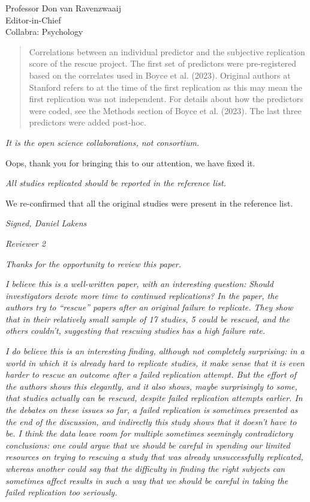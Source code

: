 \documentclass{stanfordletter}
\newcommand{\theysaid}[1]{\begin{leftbar} \noindent 
		\textsl{ #1}\end{leftbar}}
\newcommand{\revised}[1]{\begin{quote}	#1 \end{quote}}
\begin{document}
\begin{letter}{Professor Don van Ravenzwaaij \\ Editor-in-Chief \\ Collabra: Psychology }
		\revised{Correlations between an individual predictor and the subjective replication score of the rescue project. The first set of predictors were pre-registered based on the correlates used in Boyce et al. (2023). Original authors at Stanford refers to at the time of the first replication as this may mean the first replication was not independent. For details about how the predictors were coded, see the Methods section of Boyce et al. (2023). The last three predictors were added post-hoc.}
		

		\theysaid{It is the open science collaborations, not consortium.}
		
		Oops, thank you for bringing this to our attention, we have fixed it. 
		
		\theysaid{All studies replicated should be reported in the reference list.}
		We re-confirmed that all the original studies were present in the reference list. 
		
		\theysaid{Signed, Daniel Lakens}
		
		\theysaid{Reviewer 2}
		
		\theysaid{Thanks for the opportunity to review this paper.}
		
		\theysaid{I believe this is a well-written paper, with an interesting question: Should investigators devote more time to continued replications?
		In the paper, the authors try to “rescue” papers after an original failure to replicate. They show that in their relatively small sample of 17 studies, 5 could be rescued, and the others couldn’t, suggesting that rescuing studies has a high failure rate.}
		
		\theysaid{I do believe this is an interesting finding, although not completely surprising: in a world in which it is already hard to replicate studies, it make sense that it is even harder to rescue an outcome after a failed replication attempt. But the effort of the authors shows this elegantly, and it also shows, maybe surprisingly to some, that studies actually can be rescued, despite failed replication attempts earlier. In the debates on these issues so far, a failed replication is sometimes presented as the end of the discussion, and indirectly this study shows that it doesn’t have to be. I think the data leave room for multiple sometimes seemingly contradictory conclusions: one could argue that we should be careful in spending our limited resources on trying to rescuing a study that was already unsuccessfully replicated, whereas another could say that the difficulty in finding the right subjects can sometimes affect results in such a way that we should be careful in taking the failed replication too seriously.}
		

\end{letter}
\end{document}
